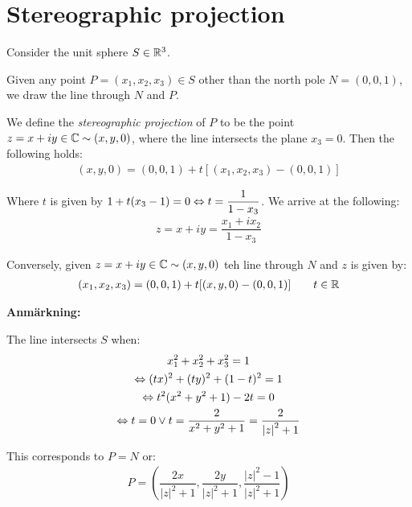 \section{Stereographic projection}\par
\noindent Consider the unit sphere $S\in\mathbb{R}^3$.\par
\noindent Given any point $P = (x_1,x_2,x_3)\in S$ other than the north pole $N = (0,0,1)$, we draw the line through $N$ and $P$.\par
\noindent We define the \textit{stereographic projection} of $P$ to be the point $z = x+iy\in\mathbb{C}\sim (x,y,0)$, where the line intersects the plane $x_3 = 0$. Then the following holds:
\begin{equation*}
  \begin{gathered}
    (x,y,0) = (0,0,1)+t[(x_1,x_2,x_3)-(0,0,1)]
  \end{gathered}
\end{equation*}\par
\noindent Where $t$ is given by $1+t(x_3-1)=0\Leftrightarrow t= \dfrac{1}{1-x_3}$. We arrive at the following:
\begin{equation*}
  \begin{gathered}
    z = x+iy = \dfrac{x_1+ix_2}{1-x_3}
  \end{gathered}
\end{equation*}
\par\bigskip
\noindent Conversely, given $z = x+iy\in\mathbb{C}\sim (x,y,0)$ teh line through $N$ and $z$ is given by:
\begin{equation*}
  \begin{gathered}
    (x_1,x_2,x_3) = (0,0,1)+t[(x,y,0)-(0,0,1)]\qquad t\in\mathbb{R}
  \end{gathered}
\end{equation*}
\par\bigskip
\textbf{Anmärkning:}\par
\noindent The line intersects $S$ when:
\begin{equation*}
  \begin{gathered}
    x_1^2+x_2^2+x_3^2 = 1\\
    \Leftrightarrow (tx)^2+(ty)^2+(1-t)^2 = 1\\
    \Leftrightarrow t^2(x^2+y^2+1)-2t=0\\
    \Leftrightarrow t=0\vee t=\dfrac{2}{x^2+y^2+1} = \dfrac{2}{\left|z\right|^2+1}
  \end{gathered}
\end{equation*}
\par\bigskip
\noindent This corresponds to $P = N$ or:
\begin{equation*}
  \begin{gathered}
    P = \left(\dfrac{2x}{\left|z\right|^2+1},\dfrac{2y}{\left|z\right|^2+1},\dfrac{\left|z\right|^2-1}{\left|z\right|^2+1}\right)
  \end{gathered}
\end{equation*}
